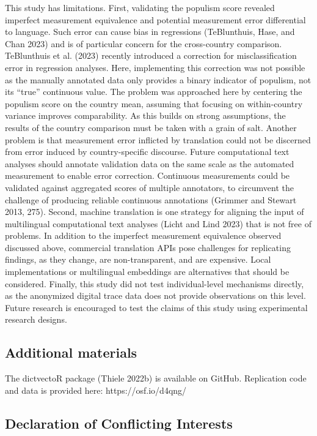 \documentclass[
]{ccr}
\begin{document}
This study has limitations. First, validating the populism score
revealed imperfect measurement equivalence and potential measurement
error differential to language. Such error can cause bias in regressions
(TeBlunthuis, Hase, and Chan 2023) and is of particular concern for the
cross-country comparison. TeBlunthuis et al. (2023) recently introduced
a correction for misclassification error in regression analyses. Here,
implementing this correction was not possible as the manually annotated
data only provides a binary indicator of populism, not its ``true''
continuous value. The problem was approached here by centering the
populism score on the country mean, assuming that focusing on
within-country variance improves comparability. As this builds on strong
assumptions, the results of the country comparison must be taken with a
grain of salt. Another problem is that measurement error inflicted by
translation could not be discerned from error induced by
country-specific discourse. Future computational text analyses should
annotate validation data on the same scale as the automated measurement
to enable error correction. Continuous measurements could be validated
against aggregated scores of multiple annotators, to circumvent the
challenge of producing reliable continuous annotations (Grimmer and
Stewart 2013, 275). Second, machine translation is one strategy for
aligning the input of multilingual computational text analyses (Licht
and Lind 2023) that is not free of problems. In addition to the
imperfect measurement equivalence observed discussed above, commercial
translation APIs pose challenges for replicating findings, as they
change, are non-transparent, and are expensive. Local implementations or
multilingual embeddings are alternatives that should be considered.
Finally, this study did not test individual-level mechanisms directly,
as the anonymized digital trace data does not provide observations on
this level. Future research is encouraged to test the claims of this
study using experimental research designs.

\hypertarget{additional-materials}{%
\subsection{Additional materials}\label{additional-materials}}

The dictvectoR package (Thiele 2022b) is available on GitHub.
Replication code and data is provided here: https://osf.io/d4qng/

\hypertarget{declaration-of-conflicting-interests}{%
\subsection{Declaration of Conflicting
Interests}\label{declaration-of-conflicting-interests}}
\end{document}
